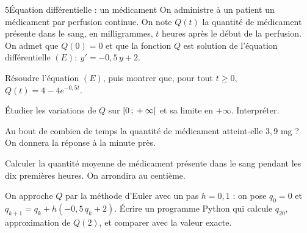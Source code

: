 \begin{exoBac}{5}{Équation différentielle : un médicament}
On administre à un patient un médicament par perfusion continue. On note $Q(t)$ la quantité de médicament présente dans le sang, en
milligrammes, $t$ heures après le début de la perfusion. On admet que $Q(0)=0$ et que la fonction $Q$ est solution de l'équation
différentielle $(E):\ y'=-0{,}5\,y+2$.
\begin{questions}
  \item Résoudre l'équation $(E)$, puis montrer que, pour tout $t\geq0$, $Q(t)=4-4e^{-0{,}5t}$.
  \item Étudier les variations de $Q$ sur $\mathopen{[}0\,{;}\,+\infty\mathclose{[}$ et sa limite en $+\infty$. Interpréter.
  \item Au bout de combien de temps la quantité de médicament atteint-elle $3{,}9$ mg ? On donnera la réponse à la minute près.
  \item Calculer la quantité moyenne de médicament présente dans le sang pendant les dix premières heures. On arrondira au centième.
  \item On approche $Q$ par la méthode d'Euler avec un pas $h=0{,}1$ : on pose $q_0=0$ et
    $q_{k+1}=q_k+h\left(-0{,}5\,q_k+2\right)$. Écrire un programme Python qui calcule $q_{20}$, approximation de $Q(2)$, et comparer avec la
    valeur exacte.
\end{questions}
\end{exoBac}

